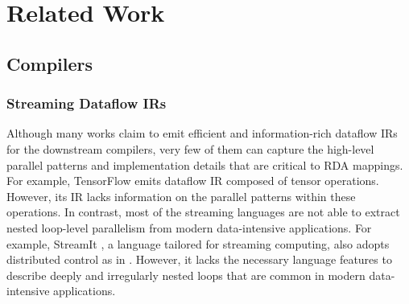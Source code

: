 \chapter{Related Work} \label{sec:related}

\section{Compilers}
\subsection{Streaming Dataflow IRs}
Although many works claim to emit efficient and information-rich dataflow IRs for the downstream compilers, 
very few of them can capture the high-level parallel patterns and implementation details that are critical 
to RDA mappings. 
For example, TensorFlow \cite{tensorflow} emits dataflow IR composed of tensor operations. 
However, its IR lacks information on the parallel patterns within these operations. 
In contrast, most of 
the streaming languages \cite{streamit, synaid, maxj} are not able to extract nested loop-level parallelism 
from modern data-intensive applications. 
For example, StreamIt \cite{streamit}, a language tailored for streaming computing, also adopts distributed 
control as in \name{}. 
However, it lacks the necessary language features to describe deeply and irregularly nested loops that are 
common in modern data-intensive applications.



